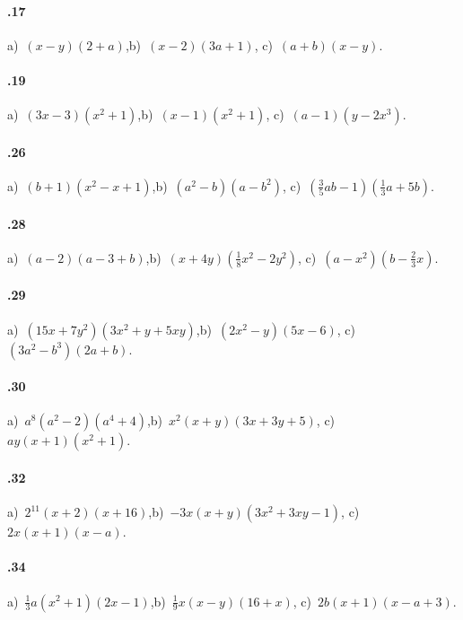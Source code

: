 \paragraph{\thechapter.17}
a)~$(x-y)(2+a)$,\quad b)~$(x-2)(3a+1)$, \quad c)~$(a+b)(x-y)$.

\paragraph{\thechapter.19}
a)~$(3x-3)\left(x^2+1\right)$,\quad b)~$(x-1)\left(x^{2}+1\right)$, \quad c)~$(a-1)\left(y-2x^{3}\right)$.

\paragraph{\thechapter.26}
a)~$(b+1)(x^{2}-x+1)$,\quad b)~$\left(a^{2}-b\right)\left(a-b^{2}\right)$, \quad c)~$\left(\frac{3}{5}ab-1\right)\left(\frac{1}{3}a+5b\right)$.

\paragraph{\thechapter.28}
a)~$(a-2)(a-3+b)$,\quad b)~$(x+4y)\left(\frac{1}{8}x^2-2y^2\right)$, \quad c)~$\left(a-x^2\right)\left(b-\frac{2}{3}x\right)$.

\paragraph{\thechapter.29}
a)~$\left(15x+7y^{2}\right)\left(3x^{2}+y+5xy\right)$,\quad b)~$\left(2x^2-y\right)(5x-6)$, \quad c)~$(3a^2-b^3)(2a+b)$.

\paragraph{\thechapter.30}
a)~$a^{8}\left(a^{2}-2\right)\left(a^{4}+4\right)$,\quad b)~$x^{2}(x+y)(3x+3y+5)$, \quad c)~$ay(x+1)(x^{2}+1)$.

\paragraph{\thechapter.32}
a)~$2^{11}(x+2)(x+16)$,\quad b)~$-3x(x+y)\left(3x^2+3xy-1\right)$, \quad c)~$2x(x+1)(x-a)$.

\paragraph{\thechapter.34}
a)~$\frac{1}{3}a(x^{2}+1)(2x-1)$,\quad b)~$\frac{1}{9}x(x-y)(16+x)$, \quad c)~$2b(x+1)(x-a+3)$.
